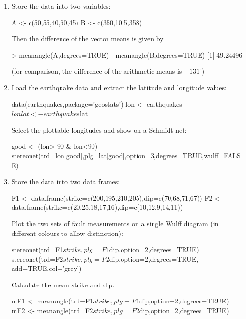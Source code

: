 \begin{enumerate}

\item Store the data into two variables:

\begin{script}
A <- c(50,55,40,60,45)
B <- c(350,10,5,358)
\end{script}

Then the difference of the vector means is given by

\begin{console}
> meanangle(A,degrees=TRUE) - meanangle(B,degrees=TRUE)
[1] 49.24496
\end{console}

(for comparison, the difference of the arithmetic means is
$-131^\circ$)

\item Load the earthquake data and extract the latitude and longitude
  values:

\begin{script}  
data(earthquakes,package='geostats')
lon <- earthquakes$lon
lat <- earthquakes$lat
\end{script}

Select the plottable longitudes and show on a Schmidt net:

\begin{script}[firstnumber=4]
good <- (lon>-90 & lon<90)
stereonet(trd=lon[good],plg=lat[good],option=3,degrees=TRUE,wulff=FALSE)
\end{script}

\item Store the data into two data frames:

\begin{script}
F1 <- data.frame(strike=c(200,195,210,205),dip=c(70,68,71,67))
F2 <- data.frame(strike=c(20,25,18,17,16),dip=c(10,12,9,14,11))
\end{script}

Plot the two sets of fault measurements on a single Wulff diagram (in
different colours to allow distinction):

\begin{script}[firstnumber=3]
stereonet(trd=F1$strike,plg=F1$dip,option=2,degrees=TRUE)
stereonet(trd=F2$strike,plg=F2$dip,option=2,degrees=TRUE,
          add=TRUE,col='grey')
\end{script}

Calculate the mean strike and dip:

\begin{script}[firstnumber=5]
mF1 <- meanangle(trd=F1$strike,plg=F1$dip,option=2,degrees=TRUE)
mF2 <- meanangle(trd=F2$strike,plg=F2$dip,option=2,degrees=TRUE)
\end{script}


\end{enumerate}

